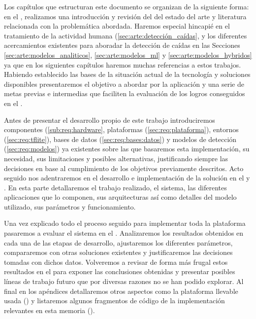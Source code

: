 Los capítulos que estructuran este documento se organizan de la siguiente forma: en el , realizamos una introducción y revisión del del estado del arte y literatura relacionada con la problemática abordada. Haremos especial hincapié en el tratamiento de la actividad humana (\autoref{sec:arte:detección_caídas}, y los diferentes acercamientos existentes para aboradar la detección de caídas en las Secciones \ref{sec:arte:modelos_analiticos}, \ref{sec:arte:modelos_ml} y \ref{sec:arte:modelos_hybridos} ya que en los siguientes capítulos haremos muchas referencias a estos trabajos. Habiendo establecido las bases de la situación actual de la tecnología y soluciones disponibles presentaremos el objetivo a abordar por la aplicación y una serie de metas previas e intermedias que faciliten la evaluación de los logros conseguidos en el .

Antes de presentar el desarrollo propio de este trabajo introduciremos componentes (\ref{sub:req:hardware}, plataformas (\ref{sec:req:plataforma}), entornos (\ref{sec:req:tflite}), bases de datos (\ref{sec:req:bases:datos}) y modelos de detección (\ref{sec:req:modelos}) ya existentes sobre las que basaremos esta implementación, su necesidad, sus limitaciones y posibles alternativas, justificando siempre las decisiones en base al cumplimiento de los objetivos previamente descritos. Acto seguido nos adentraremos en el desarrollo e implementación de la solución en el  y . En esta parte detallaremos el trabajo realizado, el sistema, las diferentes aplicaciones que lo componen, sus arquitecturas así como detalles del modelo utilizado, sus parámetros y funcionamiento.

Una vez explicado todo el proceso seguido para implementar toda la plataforma pasaremos a evaluar el sistema en el . Analizaremos los resultados obtenidos en cada una de las etapas de desarrollo, ajustaremos los diferentes parámetros, compararemos con otras soluciones existentes y justificaremos las decisiones tomadas con dichos datos. Volveremos a revisar de forma más frugal estos resultados en el  para exponer las conclusiones obtenidas y presentar posibles líneas de trabajo futuro que por diversas razones no se han podido explorar. Al final en los apéndices detallaremos otros aspectos como la plataforma llevable usada () y listaremos algunos fragmentos de código de la implementación relevantes en esta memoria ().


